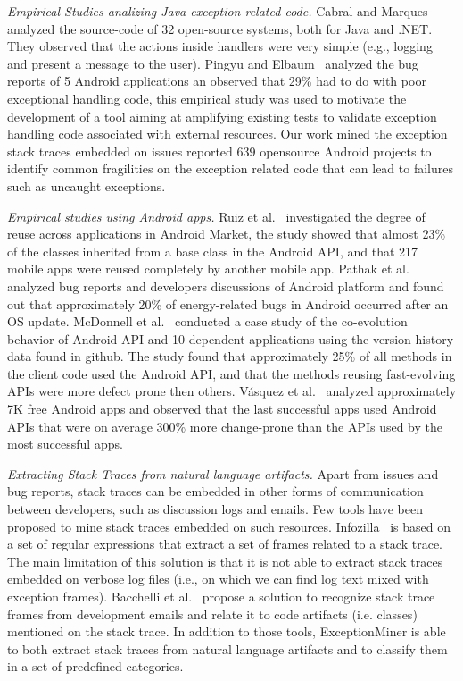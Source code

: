 \documentclass[conference]{IEEEtran}
\begin{document}
\textit{Empirical Studies analizing Java exception-related code.} 
Cabral and Marques~\cite{cabral2007exception} analyzed the
source-code of 32 open-source systems, both for Java and .NET. They
observed that the actions inside handlers were very simple (e.g., logging and present a
message to the user). Pingyu and Elbaum~\cite{Zhang12} 
analyzed the bug reports of 5 Android applications an observed that 29\% had to do with poor
exceptional handling code, this empirical study was used to motivate the development of a tool
aiming at amplifying existing tests to validate exception 
handling code associated with external resources. Our work mined the exception
stack traces embedded on issues reported 639 opensource Android projects
to identify common fragilities on the exception related code that can lead to 
failures such as uncaught exceptions. 

\textit{Empirical studies using Android apps.} Ruiz et al.~\cite{Ruiz12}
investigated the degree of reuse across applications in Android Market, the
study showed that almost 23\% of the classes inherited from a base class in the
Android API, and that 217 mobile apps were reused completely by another mobile
app. Pathak et al.~\cite{Patha11} analyzed bug reports and developers
discussions of Android platform and found out that approximately 20\% of
energy-related bugs in Android occurred after an OS update. McDonnell et
al.~\cite{McDon13} conducted a case study of the co-evolution behavior of
Android API and 10 dependent applications using the version history data found
in github. The study found that approximately 25\% of all methods in the client
code used the Android API, and that the methods reusing fast-evolving APIs were
more defect prone then others. Vásquez et al.~\cite{Linar13} analyzed
approximately 7K free Android apps and observed that the last successful apps
used Android APIs that were on average 300\% more change-prone than the APIs
used by the most successful apps. 


\textit{Extracting Stack Traces from natural language artifacts.} 
Apart from issues and bug reports, stack traces can be embedded in other forms of
communication between developers, such as discussion logs and emails.
Few tools have been proposed to mine stack traces embedded on such resources.
 Infozilla~\cite{bettenburg2008extracting} is based on a set of regular expressions that extract a set of frames
related to a stack trace. The main limitation of this solution is that it is not
able to extract stack traces embedded on verbose log files (i.e., on which we
can find log text mixed with exception frames). Bacchelli
et al.~\cite{bacchelli2012content} propose a solution to recognize stack trace frames
from development emails and relate it to code artifacts (i.e. classes) mentioned
on the stack trace. In addition to those tools, ExceptionMiner is able to 
both extract stack traces from natural language artifacts and to 
classify them in a set of predefined categories.
\end{document}
